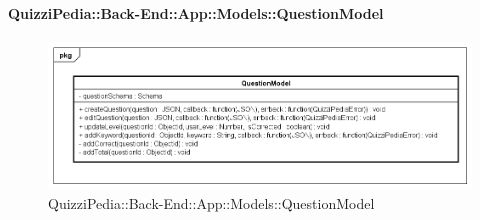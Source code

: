 \paragraph{QuizziPedia::Back-End::App::Models::QuestionModel}
\label{QuizziPedia::Back-End::App::Models::QuestionModel}
\begin{figure}
	\centering
	\includegraphics[scale=0.45]{UML/Classi/Back-End/QuizziPedia_Back-End_App_Models_questionModel.png}
	\caption{QuizziPedia::Back-End::App::Models::QuestionModel}
\end{figure}
